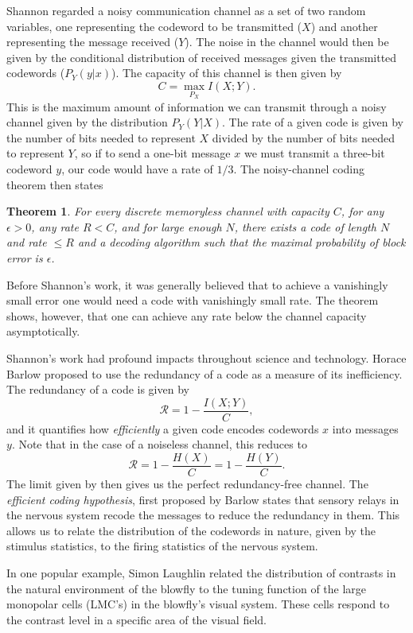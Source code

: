 Shannon regarded a noisy communication channel as a set of two random variables, one representing the codeword to be transmitted ($X$) and another representing the message received ($Y$). The noise in the channel would then be given by the conditional distribution of received messages given the transmitted codewords ($P_Y(y|x)$). The capacity of this channel is then given by
$$
C = \max_{P_X} I(X;Y).
$$
This is the maximum amount of information we can transmit through a noisy channel given by the distribution $P_Y(Y|X)$.
The rate of a given code is given by the number of bits needed to represent $X$ divided by the number of bits needed to represent $Y$, so if to send a one-bit message $x$ we must transmit a three-bit codeword $y$, our code would have a rate of $1/3$.
The noisy-channel coding theorem\cite{mackay2003information} then states
\newtheorem{noisychannel}{Theorem}
\begin{noisychannel}
\label{thm:noisychannel}
For every discrete memoryless channel with capacity $C$, for any $\epsilon>0$, any rate $R<C$, and for large enough $N$, there exists a code of length $N$ and rate $\leq R$ and a decoding algorithm such that the maximal probability of block error is $\epsilon$.
\end{noisychannel}
Before Shannon's work, it was generally believed that to achieve a vanishingly small error one would need a code with vanishingly small rate. The theorem shows, however, that one can achieve any rate below the channel capacity asymptotically.\par
Shannon's work had profound impacts throughout science and technology. Horace Barlow proposed to use the redundancy of a code as a measure of its inefficiency. The redundancy of a code is given by
$$
\mathcal{R} = 1 - \frac{I(X;Y)}{C},
$$
and it quantifies how {\em efficiently} a given code encodes codewords $x$ into messages $y$. Note that in the case of a noiseless channel, this reduces to 
$$
\mathcal{R} = 1 - \frac{H(X)}{C}= 1 - \frac{H(Y)}{C}.
$$
The limit given by  then gives us the perfect redundancy-free channel. The {\em efficient coding hypothesis}, first proposed by Barlow\cite{Barlow1961} states that sensory relays in the nervous system recode the	messages to reduce the redundancy in them. This allows us to relate the distribution of the codewords in nature, given by the stimulus statistics, to the firing statistics of the nervous system.\par
In one popular example, Simon Laughlin related the distribution of contrasts in the natural environment of the blowfly to the tuning function of the large monopolar cells (LMC's) in the blowfly's visual system\cite{Laughlin1981}. These cells respond to the contrast level in a specific area of the visual field.
